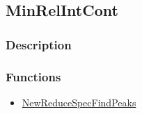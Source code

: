 \subsection{MinRelIntCont}\label{MinRelIntCont}
\subsubsection{Description}

\subsubsection{Functions}
\begin{itemize}
\item \hyperref[NewReduceSpecFindPeaks]{NewReduceSpecFindPeaks}
\end{itemize}

